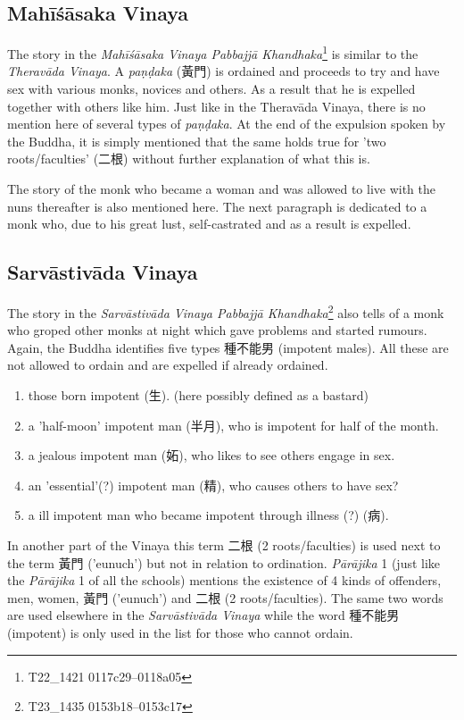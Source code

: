 \subsection{Mahīśāsaka Vinaya}
The story in the {\em Mahīśāsaka Vinaya Pabbajjā Khandhaka}\footnote{T22_1421 0117c29–0118a05} is similar to the {\em Theravāda Vinaya}. A {\em paṇḍaka} (黃門) is ordained and proceeds to try and have sex with various monks, novices and others. As a result that he is expelled together with others like him. Just like in the Theravāda Vinaya, there is no mention here of several types of {\em paṇḍaka}. At the end of the expulsion spoken by the Buddha, it is simply mentioned that the same holds true for 'two roots/faculties' (二根) without further explanation of what this is.

The story of the monk who became a woman and was allowed to live with the nuns thereafter is also mentioned here.
The next paragraph is dedicated to a monk who, due to his great lust, self-castrated and as a result is expelled.


\subsection{Sarvāstivāda Vinaya}
The story in the {\em Sarvāstivāda Vinaya Pabbajjā Khandhaka}\footnote{T23_1435 0153b18–0153c17} also tells of a monk who groped other monks at night which gave problems and started rumours. Again, the Buddha identifies five types 種不能男 (impotent males). All these are not allowed to ordain and are expelled if already ordained.

\begin{enumerate}
\item those born impotent (生). (here possibly defined as a bastard)
\item a 'half-moon' impotent man (半月), who is impotent for half of the month.
\item a jealous impotent man (妬), who likes to see others engage in sex.
\item an 'essential'(?) impotent man (精), who causes others to have sex?
\item a ill impotent man who became impotent through illness (?) (病).
\end{enumerate}

In another part of the Vinaya this term 二根 (2 roots/faculties) is used next to the term 黃門 ('eunuch') but not in relation to ordination. {\em Pārājika} 1 (just like the {\em Pārājika} 1 of all the schools) mentions the existence of 4 kinds of offenders, men, women, 黃門 ('eunuch') and 二根 (2 roots/faculties). The same two words are used elsewhere in the {\em Sarvāstivāda Vinaya} while the word 種不能男 (impotent) is only used in the list for those who cannot ordain.



